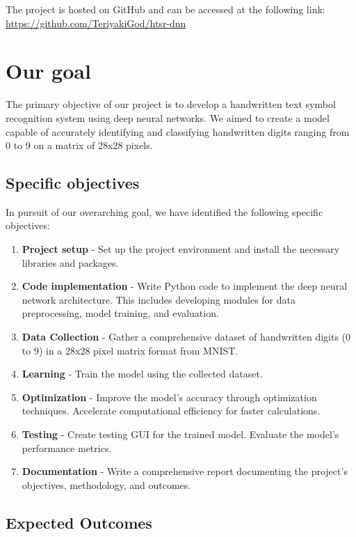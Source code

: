 \documentclass{article}
\begin{document}
The project is hosted on GitHub and can be accessed at the following link: \url{https://github.com/TeriyakiGod/htsr-dnn}

\newpage
\section{Our goal}

The primary objective of our project is to develop a handwritten text symbol recognition system using deep neural networks. We aimed to create a model capable of accurately identifying and classifying handwritten digits ranging from 0 to 9 on a matrix of 28x28 pixels.

\subsection{Specific objectives}

In pursuit of our overarching goal, we have identified the following specific objectives:

\begin{enumerate}
    \item \textbf{Project setup} - Set up the project environment and install the necessary libraries and packages.
    \item \textbf{Code implementation} - Write Python code to implement the deep neural network architecture. This includes developing modules for data preprocessing, model training, and evaluation.
    \item \textbf{Data Collection} - Gather a comprehensive dataset of handwritten digits (0 to 9) in a 28x28 pixel matrix format from MNIST.
	\item \textbf{Learning} - Train the model using the collected dataset.
	\item \textbf{Optimization} - Improve the model's accuracy through optimization techniques. Accelerate computational efficiency for faster calculations.
    \item \textbf{Testing} - Create testing GUI for the trained model. Evaluate the model's performance metrics.
	\item \textbf{Documentation} - Write a comprehensive report documenting the project's objectives, methodology, and outcomes.
\end{enumerate}

\subsection{Expected Outcomes}
\end{document}
